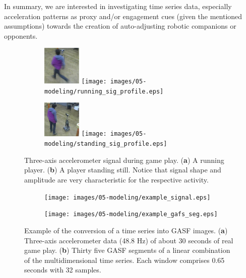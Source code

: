In summary, we are interested in investigating time series data, especially acceleration patterns as proxy and/or engagement cues (given the mentioned assumptions) towards the creation of auto-adjusting robotic companions or opponents.





\begin{figure}[H]
\centering
\begin{subfigure}[H]{\textwidth}
\centering
\includegraphics[width=0.2\textwidth]{images/05-modeling/enricorun.png} 
\texttt{[image: images/05-modeling/running\_sig\_profile.eps]} 
\caption{}
\end{subfigure}

\begin{subfigure}[H]{\textwidth}
\centering
\includegraphics[width=0.2\textwidth]{images/05-modeling/enricostill.png}
\texttt{[image: images/05-modeling/standing\_sig\_profile.eps]} 
\caption{}
\end{subfigure} \vspace{-6pt}
\caption{Three-axis accelerometer signal during game play. (\textbf{a}) A running player. (\textbf{b}) A player standing still. Notice that signal shape and amplitude are very characteristic for the respective activity.}
\label{figure:acc_signal_shape}
\end{figure} \unskip

\begin{figure}[H]
\centering
\begin{subfigure}[H]{\textwidth}
\centering
\texttt{[image: images/05-modeling/example\_signal.eps]}
\label{figure:accelerometer_signal}
\caption{}
\end{subfigure} \vspace{-6pt}

\begin{subfigure}[H]{\textwidth}
\centering
\texttt{[image: images/05-modeling/example\_gafs\_seg.eps]}
\caption{}
\end{subfigure} \vspace{-6pt}
\caption{Example of the conversion of a time series into GASF images. (\textbf{a}) Three-axis accelerometer data (48.8 Hz) of about 30 seconds of real game play. (\textbf{b}) Thirty five GASF segments of a linear combination of the multidimensional time series. Each window comprises 0.65 seconds with 32 samples.}
\label{figure:acc_signal_gasfs}
\end{figure}







